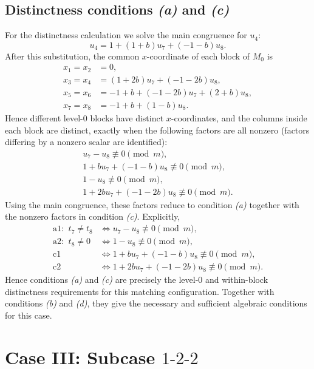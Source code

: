 \documentclass[11pt]{article}
\newcommand{\mymod}{\pmod m}
\begin{document}
\subsection{Distinctness conditions \emph{(a)} and \emph{(c)}}
For the distinctness calculation we solve the main congruence for $u_{4}$:
\[
u_{4}=1 + \left(1 + b\right)u_{7} + \left(-1 - b\right)u_{8}.
\]
After this substitution, the common $x$-coordinate of each block of $M_0$ is
\[
\begin{aligned}
x_{1}=x_{2}&=0,\\
x_{3}=x_{4}&=\left(1 + 2b\right)u_{7} + \left(-1 - 2b\right)u_{8},\\
x_{5}=x_{6}&=-1 + b + \left(-1 - 2b\right)u_{7} + \left(2 + b\right)u_{8},\\
x_{7}=x_{8}&=-1 + b + \left(1 - b\right)u_{8}.
\end{aligned}
\]
Hence different level-$0$ blocks have distinct $x$-coordinates, and the columns inside each block are distinct, exactly when the following factors are all nonzero (factors differing by a nonzero scalar are identified):
\[
\begin{gathered}
u_{7} - u_{8}\not\equiv 0\mymod,\\
1 + bu_{7} + \left(-1 - b\right)u_{8}\not\equiv 0\mymod,\\
1 - u_{8}\not\equiv 0\mymod,\\
1 + 2bu_{7} + \left(-1 - 2b\right)u_{8}\not\equiv 0\mymod.
\end{gathered}
\]
Using the main congruence, these factors reduce to condition \emph{(a)} together with the nonzero factors in condition \emph{(c)}.  Explicitly,
\[
\begin{aligned}
\text{a1: }\ t_7 \neq t_8&\Longleftrightarrow u_{7} - u_{8}\not\equiv0\mymod,\\
\text{a2: }\ t_8 \neq 0&\Longleftrightarrow 1 - u_{8}\not\equiv0\mymod,\\
\text{c1}&\Longleftrightarrow 1 + bu_{7} + \left(-1 - b\right)u_{8}\not\equiv0\mymod,\\
\text{c2}&\Longleftrightarrow 1 + 2bu_{7} + \left(-1 - 2b\right)u_{8}\not\equiv0\mymod.
\end{aligned}
\]
Hence conditions \emph{(a)} and \emph{(c)} are precisely the level-$0$ and within-block distinctness requirements for this matching configuration.  Together with conditions \emph{(b)} and \emph{(d)}, they give the necessary and sufficient algebraic conditions for this case.
\section{Case III: Subcase $1\text{-}2\text{-}2$}
\end{document}
